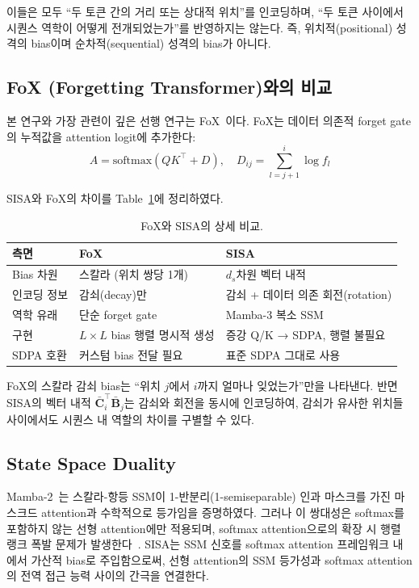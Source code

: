 \documentclass[11pt]{article}
\begin{document}
이들은 모두 ``두 토큰 간의 거리 또는 상대적 위치''를 인코딩하며, ``두 토큰 사이에서 시퀀스 역학이 어떻게 전개되었는가''를 반영하지는 않는다. 즉, 위치적(positional) 성격의 bias이며 순차적(sequential) 성격의 bias가 아니다.

\subsection{FoX (Forgetting Transformer)와의 비교}

본 연구와 가장 관련이 깊은 선행 연구는 FoX~\citep{fox}이다. FoX는 데이터 의존적 forget gate의 누적값을 attention logit에 추가한다:
\begin{equation}
A = \text{softmax}(QK^\top + D), \quad D_{ij} = \sum_{l=j+1}^{i} \log f_l
\end{equation}

SISA와 FoX의 차이를 Table~\ref{tab:fox_comparison}에 정리하였다.

\begin{table}[h]
\centering
\small
\caption{FoX와 SISA의 상세 비교.}
\label{tab:fox_comparison}
\begin{tabular}{lll}
\toprule
\textbf{측면} & \textbf{FoX} & \textbf{SISA} \\
\midrule
Bias 차원 & 스칼라 (위치 쌍당 1개) & $d_s$차원 벡터 내적 \\
인코딩 정보 & 감쇠(decay)만 & 감쇠 + 데이터 의존 회전(rotation) \\
역학 유래 & 단순 forget gate & Mamba-3 복소 SSM \\
구현 & $L \times L$ bias 행렬 명시적 생성 & 증강 Q/K → SDPA, 행렬 불필요 \\
SDPA 호환 & 커스텀 bias 전달 필요 & 표준 SDPA 그대로 사용 \\
\bottomrule
\end{tabular}
\end{table}

FoX의 스칼라 감쇠 bias는 ``위치 $j$에서 $i$까지 얼마나 잊었는가''만을 나타낸다. 반면 SISA의 벡터 내적 $\bar{\mathbf{C}}_i^\top \bar{\mathbf{B}}_j$는 감쇠와 회전을 동시에 인코딩하여, 감쇠가 유사한 위치들 사이에서도 시퀀스 내 역할의 차이를 구별할 수 있다.

\subsection{State Space Duality}

Mamba-2~\citep{dao2024mamba2}는 스칼라-항등 SSM이 1-반분리(1-semiseparable) 인과 마스크를 가진 마스크드 attention과 수학적으로 등가임을 증명하였다. 그러나 이 쌍대성은 softmax를 포함하지 않는 선형 attention에만 적용되며, softmax attention으로의 확장 시 행렬 랭크 폭발 문제가 발생한다~\citep{ssd_extended}. SISA는 SSM 신호를 softmax attention 프레임워크 내에서 가산적 bias로 주입함으로써, 선형 attention의 SSM 등가성과 softmax attention의 전역 접근 능력 사이의 간극을 연결한다.
\end{document}
